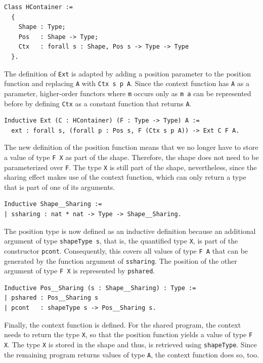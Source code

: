\documentclass[a4paper, 11pt, fleqn, twoside, abstract=on]{scrreprt}
\newcommand{\hinl}[1]{\texttt{#1}}
\newcommand{\cinl}[1]{\texttt{#1}}
\begin{document}
\begin{verbatim}
Class HContainer :=
  {
    Shape : Type;
    Pos   : Shape -> Type;
    Ctx   : forall s : Shape, Pos s -> Type -> Type
  }.
\end{verbatim}

The definition of \cinl{Ext} is adapted by adding a position parameter to the position function and replacing \cinl{A} with \cinl{Ctx s p A}.
Since the context function has \cinl{A} as a parameter, higher-order functors where \hinl{m} occurs only as \hinl{m a} can be represented before by defining \cinl{Ctx} as a constant function that returns \cinl{A}.
 
\begin{verbatim}
Inductive Ext (C : HContainer) (F : Type -> Type) A :=
  ext : forall s, (forall p : Pos s, F (Ctx s p A)) -> Ext C F A.
\end{verbatim}

The new definition of the position function means that we no longer have to store a value of type \cinl{F X} as part of the shape.
Therefore, the shape does not need to be parameterized over \cinl{F}.
The type \cinl{X} is still part of the shape, nevertheless, since the sharing effect makes use of the context function, which can only return a type that is part of one of its arguments.

\begin{verbatim}
Inductive Shape__Sharing :=
| ssharing : nat * nat -> Type -> Shape__Sharing.
\end{verbatim}

The position type is now defined as an inductive definition because an additional argument of type \cinl{shapeType s}, that is, the quantified type \cinl{X}, is part of the constructor \cinl{pcont}.
Consequently, this covers all values of type \cinl{F A} that can be generated by the function argument of \cinl{ssharing}.
The position of the other argument of type \cinl{F X} is represented by \cinl{pshared}.

\begin{verbatim}
Inductive Pos__Sharing (s : Shape__Sharing) : Type :=
| pshared : Pos__Sharing s
| pcont   : shapeType s -> Pos__Sharing s.
\end{verbatim}

Finally, the context function is defined.
For the shared program, the context needs to return the type \cinl{X}, so that the position function yields a value of type \cinl{F X}.
The type \cinl{X} is stored in the shape and thus, is retrieved using \cinl{shapeType}.
Since the remaining program returns values of type \cinl{A}, the context function does so, too.
\end{document}
